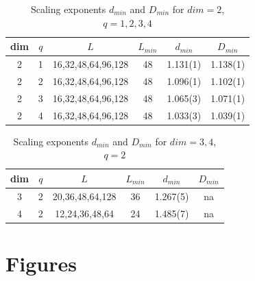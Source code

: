 \documentclass[pre,preprint]{revtex4}
\begin{document}
\begin{center}
\begin {table}[ht]
\addtolength{\tabcolsep}{5pt}
\begin{tabular}{|c| c |c|c|c|c|}
\hline
 dim  &  $q$  &  $L$                   &  $L_{min}$  &   $d_{min}$  &   $D_{min}$  \\
\hline
   2  &  1  &  16,32,48,64,96,128  &       48  &  1.131(1)  &  1.138(1)  \\
   2  &  2  &  16,32,48,64,96,128  &       48  &  1.096(1)  &  1.102(1)  \\
   2  &  3  &  16,32,48,64,96,128  &       48  &  1.065(3)  &  1.071(1)  \\
   2  &  4  &  16,32,48,64,96,128  &       48  &  1.033(3)  &  1.039(1)  \\
\hline
\end{tabular}
\caption{Scaling exponents $d_{min}$ and $D_{min}$ for $dim=2$, $q=1,2,3,4$}
\label{table:nonlin}
\end{table}
\end{center}


\begin{center}
\begin {table}[ht]
\addtolength{\tabcolsep}{5pt}
\begin{tabular}{|c| c |c|c|c|c|}
\hline
dim  &  $q$  &  $L$                   &  $L_{min}$  &   $d_{min}$  &   $D_{min}$  \\
\hline
   3  &  2  &  20,36,48,64,128  &       36  &  1.267(5)  &  na       \\
   4  &  2  &  12,24,36,48,64   &       24  &  1.485(7)  &  na       \\
\hline
\end{tabular}
\caption{Scaling exponents $d_{min}$ and $D_{min}$ for $dim=3,4$, $q=2$}
\label{table:nonlin}
\end{table}
\end{center}

\section{Figures}



\end{document}
